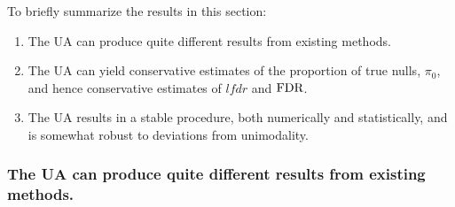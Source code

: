 \documentclass[11pt]{article}
\def\lfdr{\textit{lfdr}}
\begin{document}
To briefly summarize the results in this section:
\begin{enumerate}
\item The UA can produce quite different results from existing methods.
\item The UA can yield conservative estimates of the proportion of true nulls, $\pi_0$, and hence conservative estimates of $\lfdr$ and $\text{FDR}$.
\item The UA results in a stable procedure, both numerically and statistically, and is somewhat robust to deviations from unimodality.
\end{enumerate}

\subsubsection*{The UA can produce quite different results from existing methods.}
\end{document}
